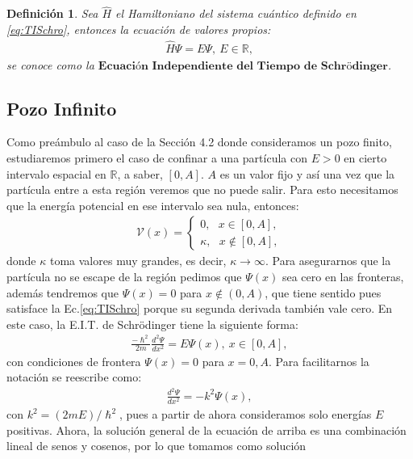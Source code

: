 \documentclass[12pt]{article}
\newtheorem{defn}[teo]{Definición}
\theoremstyle{definition}
\newcommand*{\field}[1]{\mathbb{#1}}
\begin{document}
\begin{defn}
    Sea $\hat{H}$ el Hamiltoniano del sistema cuántico definido en \eqref{eq:TISchro}, entonces la ecuación de valores propios:
    \begin{align}
        \hat{H}\Psi =  E\Psi, \: E \in \field{R},
        \label{eq:Hamiltoniano}
    \end{align}
    se conoce como la $\textbf{Ecuación Independiente del Tiempo de Schrödinger}$.
    \label{def:E.I.TdeSch}
\end{defn}
\subsection{Pozo Infinito}
\noindent
Como preámbulo al caso de la Sección 4.2 donde consideramos un pozo finito, estudiaremos primero el caso de confinar a una partícula con $E>0$ en cierto intervalo espacial en $\field{R}$, a saber, $[0,A]$. $A$ es un valor fijo y así una vez que la partícula entre a esta región veremos que no puede salir.  Para esto necesitamos que la energía potencial en ese intervalo sea nula, entonces:
\begin{align*}
        \mathcal{V}(x) = 
        \left\{ \begin{array}{ll}
        0, \:\:\:  x \in [0,A],
        \\
        \kappa, \:\:\: x \notin [0,A],
        \end{array}
        \right.
\end{align*}
donde $\kappa$ toma valores muy grandes, es decir, $\kappa \to\infty$. Para asegurarnos que la partícula no se escape de la región pedimos que $\Psi(x)$ sea cero en las fronteras, además tendremos que $\Psi(x) = 0$ para $x \notin (0,A)$, que tiene sentido pues satisface la Ec.\eqref{eq:TISchro} porque su segunda derivada también vale cero. En este caso, la E.I.T. de Schrödinger tiene la siguiente forma:
\begin{align}
    \frac{-\hslash^2}{2m}\frac{d^2\Psi}{dx^2} = E\Psi(x), \:x\in[0,A],
    \label{eq:Ec4}
\end{align}
con condiciones de frontera $\Psi(x) = 0$ para $x=0,A$.
Para facilitarnos la notación se reescribe como:
\begin{align*}
    \frac{d^2\Psi}{dx^2} = -k^2\Psi(x),
\end{align*}
con $k^2 = (2mE)/\hslash^2$, pues a partir de ahora consideramos solo energías $E$ positivas. Ahora, la solución general de la ecuación de arriba es una combinación lineal de senos y cosenos, por lo que tomamos como solución
\end{document}
